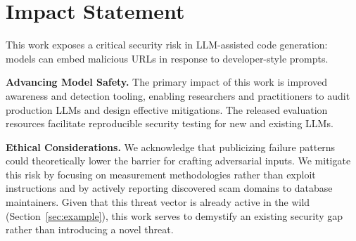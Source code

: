 \section{Impact Statement}

This work exposes a critical security risk in LLM-assisted code generation: 
models can embed malicious URLs in response to developer-style prompts. 

\noindent \textbf{Advancing Model Safety.} 
The primary impact of this work is improved awareness and detection 
tooling, enabling researchers and practitioners to audit production LLMs and 
design effective mitigations. 
The released evaluation resources facilitate reproducible 
security testing for new and existing LLMs.

\noindent \textbf{Ethical Considerations.} 
We acknowledge that publicizing failure patterns could theoretically lower 
the barrier for crafting adversarial inputs. 
We mitigate this risk by focusing on measurement methodologies 
rather than exploit instructions and by actively reporting 
discovered scam domains to database maintainers. 
Given that this threat vector is already active in the wild 
(Section~\ref{sec:example}), this work serves to demystify an 
existing security gap rather than introducing a novel threat.



